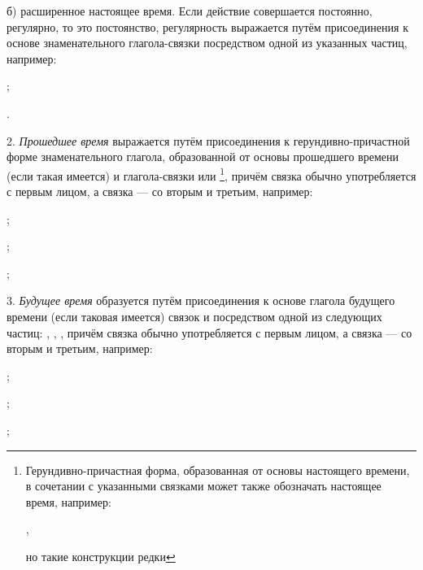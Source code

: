 б) расширенное настоящее время. Если действие совершается постоянно, регулярно, то это постоянство, регулярность выражается путём присоединения к основе знаменательного глагола-связки  посредством одной из указанных частиц, например:
\begin{prfsample}
	\item {};
	\item {}.
\end{prfsample}

2. \emph{Прошедшее время} выражается путём присоединения к герун\-див\-но-при\-част\-ной форме знаменательного глагола, образованной от основы прошедшего времени (если такая имеется) и глагола-связки  или \footnote[38]{Герундивно-причастная форма, образованная от основы настоящего времени, в сочетании с указанными связками может также обозначать настоящее время, например:
\begin{prfsample}
	\item {},
\end{prfsample}
но такие конструкции редки},
причём связка  обычно употребляется с первым лицом, а связка  --- со вторым и третьим, например:
\begin{prfsample}
	\item {};
	\item {};
	\item {};
\end{prfsample}

3. \emph{Будущее время} образуется путём присоединения к основе глагола будущего времени (если таковая имеется) связок  и  посредством одной из следующих частиц: , , , причём связка  обычно употребляется с первым лицом, а связка  --- со вторым и третьим, например:
\begin{prfsample}
	\item {};
	\item {};
	\item {};
\end{prfsample}


